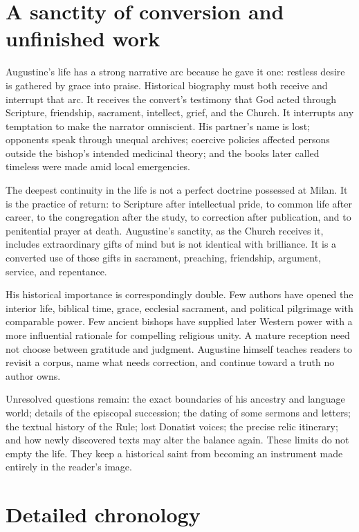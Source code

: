 \section{A sanctity of conversion and unfinished work}\label{sec:aug-synthesis}

Augustine's life has a strong narrative arc because he gave it one: restless
desire is gathered by grace into praise. Historical biography must both
receive and interrupt that arc. It receives the convert's testimony that God
acted through Scripture, friendship, sacrament, intellect, grief, and the
Church. It interrupts any temptation to make the narrator omniscient. His
partner's name is lost; opponents speak through unequal archives; coercive
policies affected persons outside the bishop's intended medicinal theory; and
the books later called timeless were made amid local emergencies.

The deepest continuity in the life is not a perfect doctrine possessed at
Milan. It is the practice of return: to Scripture after intellectual pride, to
common life after career, to the congregation after the study, to correction
after publication, and to penitential prayer at death. Augustine's sanctity,
as the Church receives it, includes extraordinary gifts of mind but is not
identical with brilliance. It is a converted use of those gifts in sacrament,
preaching, friendship, argument, service, and repentance.

His historical importance is correspondingly double. Few authors have opened
the interior life, biblical time, grace, ecclesial sacrament, and political
pilgrimage with comparable power. Few ancient bishops have supplied later
Western power with a more influential rationale for compelling religious
unity. A mature reception need not choose between gratitude and judgment.
Augustine himself teaches readers to revisit a corpus, name what needs
correction, and continue toward a truth no author owns.

Unresolved questions remain: the exact boundaries of his ancestry and language
world; details of the episcopal succession; the dating of some sermons and
letters; the textual history of the Rule; lost Donatist voices; the precise
relic itinerary; and how newly discovered texts may alter the balance again.
These limits do not empty the life. They keep a historical saint from becoming
an instrument made entirely in the reader's image.

\section{Detailed chronology}\label{sec:aug-detailed-chronology}

